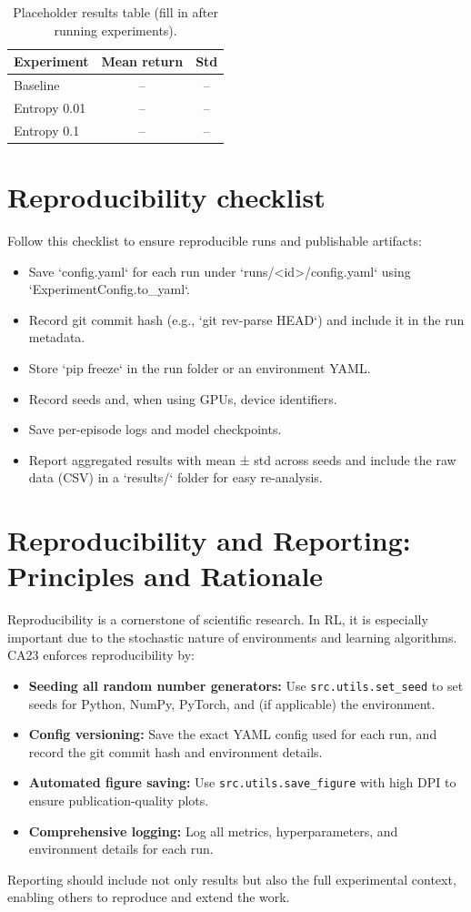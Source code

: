 \documentclass[11pt]{article}
\begin{document}
\begin{table}[h]
\centering
\begin{tabular}{@{}lcc@{}}\toprule
Experiment & Mean return & Std \\\midrule
Baseline & -- & -- \\
Entropy 0.01 & -- & -- \\
Entropy 0.1 & -- & -- \\
\bottomrule
\end{tabular}
\caption{Placeholder results table (fill in after running experiments).}
\label{tab:results}
\end{table}

\section{Reproducibility checklist}
Follow this checklist to ensure reproducible runs and publishable artifacts:
\begin{itemize}
\item Save `config.yaml` for each run under `runs/<id>/config.yaml` using
  `ExperimentConfig.to_yaml`.
\item Record git commit hash (e.g., `git rev-parse HEAD`) and include it in the
  run metadata.
\item Store `pip freeze` in the run folder or an environment YAML.
\item Record seeds and, when using GPUs, device identifiers.
\item Save per-episode logs and model checkpoints.
\item Report aggregated results with mean ± std across seeds and include the
  raw data (CSV) in a `results/` folder for easy re-analysis.
\end{itemize}

\section{Reproducibility and Reporting: Principles and Rationale}
Reproducibility is a cornerstone of scientific research. In RL, it is especially important due to the stochastic nature of environments and learning algorithms. CA23 enforces reproducibility by:
\begin{itemize}
  \item \textbf{Seeding all random number generators:} Use \texttt{src.utils.set_seed} to set seeds for Python, NumPy, PyTorch, and (if applicable) the environment.
  \item \textbf{Config versioning:} Save the exact YAML config used for each run, and record the git commit hash and environment details.
  \item \textbf{Automated figure saving:} Use \texttt{src.utils.save_figure} with high DPI to ensure publication-quality plots.
  \item \textbf{Comprehensive logging:} Log all metrics, hyperparameters, and environment details for each run.
\end{itemize}
Reporting should include not only results but also the full experimental context, enabling others to reproduce and extend the work.
\end{document}
